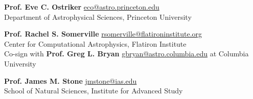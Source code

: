 \documentclass[12pt]{article}
\begin{document}


{\small {\bf Prof. Eve C. Ostriker}
\url{eco@astro.princeton.edu}\\
Department of Astrophysical Sciences, Princeton University}

\bigskip

{\small {\bf Prof. Rachel S. Somerville}
\url{rsomerville@flatironinstitute.org}\\
Center for Computational Astrophysics, Flatiron Institute\\
Co-sign with {\bf Prof. Greg L. Bryan} \url{gbryan@astro.columbia.edu} at Columbia University}



\bigskip

{\small {\bf Prof. James M. Stone}
\url{jmstone@ias.edu}\\
School of Natural Sciences, Institute for Advanced Study}
\end{document}
